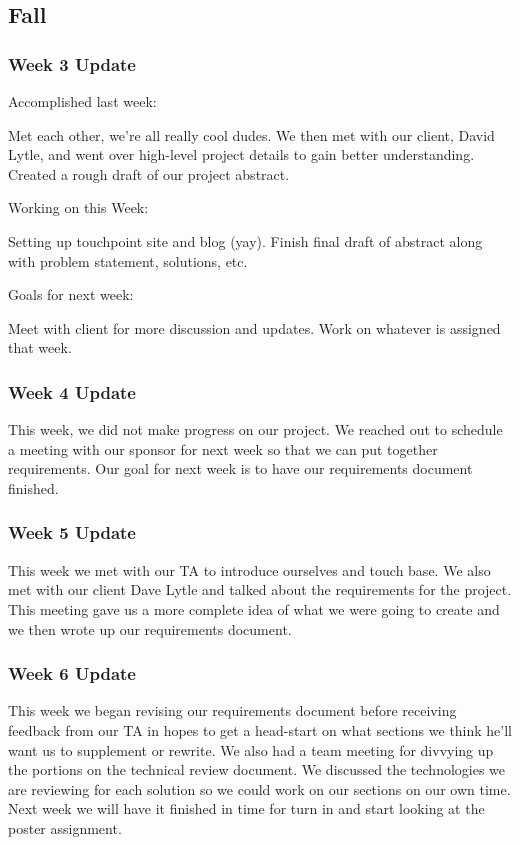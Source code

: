 

\subsection{Fall}

\subsubsection{Week 3 Update}
Accomplished last week:​

Met each other, we're all really cool dudes.
We then met with our client, David Lytle, and went over high-level project details to gain better understanding.
Created a rough draft of our project abstract.

Working on this Week:

Setting up touchpoint site and blog (yay).
​Finish final draft of abstract along with problem statement, solutions, etc.

Goals for next week:

Meet with client for more discussion and updates.
Work on whatever is assigned that week.


\subsubsection{Week 4 Update}
This week, we did not make progress on our project.
We reached out to schedule a meeting with our sponsor for next week so that we can put together requirements.
Our goal for next week is to have our requirements document finished.

\subsubsection{Week 5 Update}
This week we met with our TA to introduce ourselves and touch base.
We also met with our client Dave Lytle and talked about the requirements for the project.
This meeting gave us a more complete idea of what we were going to create and we then wrote up our requirements document.

\subsubsection{Week 6 Update}
This week we began revising our requirements document before receiving feedback from our TA in hopes to get a head-start on what sections we think he'll want us to supplement or rewrite.
We also had a team meeting for divvying up the portions on the technical review document.
We discussed the technologies we are reviewing for each solution so we could work on our sections on our own time.
Next week we will have it finished in time for turn in and start looking at the poster assignment.


